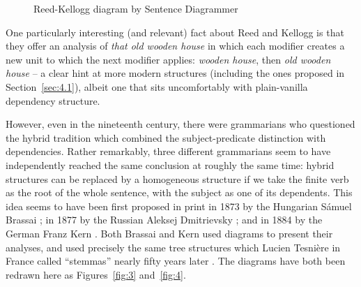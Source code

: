 \documentclass[output=paper
	        ,collection
	        ,collectionchapter
 	        ,biblatex
                ,babelshorthands
                ,newtxmath
                ,draftmode
                ,colorlinks, citecolor=brown
]{langscibook}
\begin{document}
 \begin{figure}
 	\centering
{}
	\caption{Reed-Kellogg diagram by Sentence Diagrammer}
	\label{fig:2}
 \end{figure}
 
One particularly interesting (and relevant) fact about Reed and Kellogg is that they offer an analysis of \emph{that old wooden house} in which each modifier creates a new unit to which the next modifier applies: \emph{wooden house}, then \emph{old wooden house} \citep[18]{Percival1976} – a clear hint at more modern structures (including the ones proposed in Section~\ref{sec:4.1}), albeit one that sits uncomfortably with plain-vanilla dependency structure.
 
However, even in the nineteenth century, there were grammarians who questioned the hybrid tradition which combined the subject-predicate distinction with dependencies. Rather remarkably, three different grammarians seem to have independently reached the same conclusion at roughly the same time: hybrid structures can be replaced by a homogeneous structure if we take the finite verb as the root of the whole sentence, with the subject as one of its dependents. This idea seems to have been first proposed in print in 1873 by the Hungarian Sámuel Brassai \citep{Imrenyi2013a,ImrenyiVladarTBA}; in 1877 by the Russian Aleksej Dmitrievsky \citep{Seriot2004}; and in 1884 by the German Franz Kern \citep{Kern1884a-u}. Both Brassai and Kern used diagrams to present their analyses, and used precisely the same tree structures which Lucien Tesnière in France called ``stemmas'' nearly fifty years later \citep{Tesniere59a-u,Tesniere2015a-u}. The diagrams have both been redrawn here as Figures~\ref{fig:3} and~\ref{fig:4}.
\end{document}
